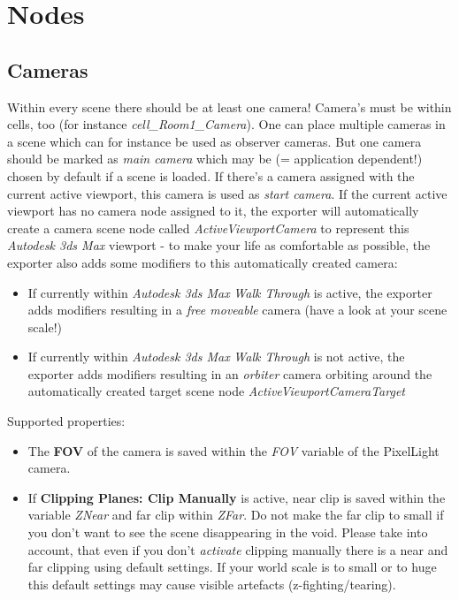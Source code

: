 \chapter{Nodes}




\section{Cameras}
Within every scene there should be at least one camera! Camera's must be within cells, too (for instance \emph{cell\_Room1\_Camera}). One can place multiple cameras in a scene which can for instance be used as observer cameras. But one camera should be marked as \emph{main camera} which may be (= application dependent!) chosen by default if a scene is loaded. If there's a camera assigned with the current active viewport, this camera is used as \emph{start camera}. If the current active viewport has no camera node assigned to it, the exporter will automatically create a camera scene node called \emph{ActiveViewportCamera} to represent this \emph{Autodesk 3ds Max} viewport - to make your life as comfortable as possible, the exporter also adds some modifiers to this automatically created camera:
\begin{itemize}
\item{If currently within \emph{Autodesk 3ds Max} \emph{Walk Through} is active, the exporter adds modifiers resulting in a \emph{free moveable} camera (have a look at your scene scale!)}
\item{If currently within \emph{Autodesk 3ds Max} \emph{Walk Through} is not active, the exporter adds modifiers resulting in an \emph{orbiter} camera orbiting around the automatically created target scene node \emph{ActiveViewportCameraTarget}}
\end{itemize}

Supported properties:
\begin{itemize}
\item{The \textbf{FOV} of the camera is saved within the \emph{FOV} variable of the PixelLight camera.}
\item{If \textbf{Clipping Planes: Clip Manually} is active, near clip is saved within the variable \emph{ZNear} and far clip within \emph{ZFar}. Do not make the far clip to small if you don't want to see the scene disappearing in the void. Please take into account, that even if you don't \emph{activate} clipping manually there is a near and far clipping using default settings. If your world scale is to small or to huge this default settings may cause visible artefacts (z-fighting/tearing).}
\end{itemize}

